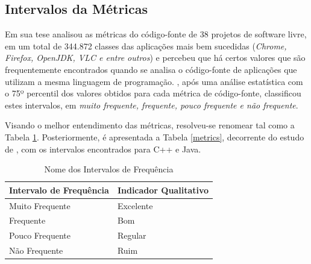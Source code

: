 \subsection{Intervalos da Métricas}
\label{Intervalos das Métricas}
Em sua tese  analisou as métricas do código-fonte de 
38 projetos de software livre, em um total de 344.872 classes das aplicações 
mais bem sucedidas (\textit{Chrome, Firefox, OpenJDK, VLC e entre outros}) e 
percebeu que há certos valores que são frequentemente encontrados quando se 
analisa o código-fonte de aplicações que utilizam a mesma linguagem de 
programação. , após uma análise estatística com o 75º percentil dos valores obtidos para cada métrica de código-fonte, classificou estes 
intervalos, em \textit{muito frequente, frequente, pouco frequente e não 
frequente}. 

Visando o melhor entendimento das métricas, resolveu-se renomear tal como a 
Tabela \ref{nomes}. Posteriormente, é apresentada a Tabela \ref{metrics}, 
decorrente do estudo de , com os intervalos 
encontrados para C++ e Java.

	\begin{table}[!ht]
	\begin{center}
	 \begin{tabular}{|l|l|}
		\hline
		Intervalo de Frequência & Indicador Qualitativo \\ \hline
		Muito Frequente & Excelente \\ \hline
		Frequente       & Bom       \\ \hline
		Pouco Frequente & Regular   \\ \hline
		Não Frequente   & Ruim      \\ \hline
		\end{tabular}
		\caption{Nome dos Intervalos de Frequência}
		\label{nomes}
		\end{center}
		\end{table}
		
\FloatBarrier
	

